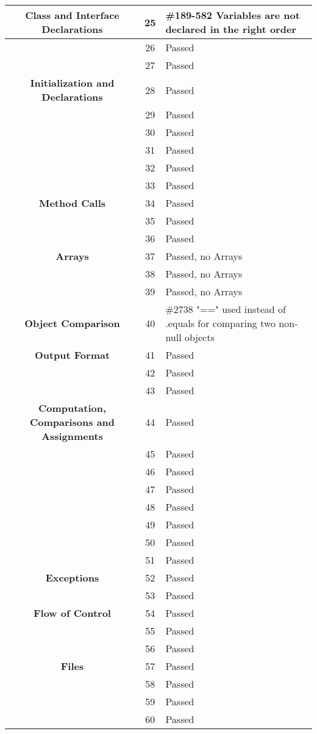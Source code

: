 \documentclass[11pt, a4paper,titlepage]{article}
\begin{document}
  \newpage
  \begin{tabularx}{\textwidth}{| c |c |X |}
  	\hline \textbf{Class and Interface Declarations} & 25 & \#189-582 Variables are not declared in the right order \\
  	\hline  & 26 & Passed \\
  	\hline  & 27 & Passed \\
  	\hline \textbf{Initialization and Declarations} & 28 & Passed \\
  	\hline  & 29 & Passed \\
  	\hline  & 30 & Passed \\
  	\hline  & 31 & Passed \\
  	\hline  & 32 & Passed \\
  	\hline  & 33 & Passed \\
  	\hline \textbf{Method Calls} & 34 & Passed \\
  	\hline  & 35 & Passed \\
  	\hline  & 36 & Passed \\
  	\hline \textbf{Arrays} & 37 & Passed, no Arrays \\
  	\hline  & 38 & Passed, no Arrays \\
  	\hline  & 39 & Passed, no Arrays \\
  	\hline \textbf{Object Comparison} & 40 & \#2738 "==" used instead of .equals for comparing two non-null objects \\
  	\hline \textbf{Output Format} & 41 & Passed \\
  	\hline  & 42 & Passed \\
  	\hline  & 43 & Passed \\   
  	\hline \textbf{Computation, Comparisons and Assignments} & 44 & Passed \\
  	\hline  & 45 & Passed \\
  	\hline  & 46 & Passed \\
  	\hline  & 47 & Passed \\
  	\hline  & 48 & Passed \\
  	\hline  & 49 & Passed \\
  	\hline  & 50 & Passed \\
  	\hline  & 51 & Passed \\
  	\hline \textbf{Exceptions} & 52 & Passed \\
  	\hline  & 53 & Passed \\
  	\hline \textbf{Flow of Control} & 54 & Passed \\
  	\hline  & 55 & Passed \\
  	\hline  & 56 & Passed \\
  	\hline \textbf{Files} & 57 & Passed \\
  	\hline  & 58 & Passed \\
  	\hline  & 59 & Passed \\
  	\hline  & 60 & Passed \\
  	\hline
  \end{tabularx} 
\end{document}
